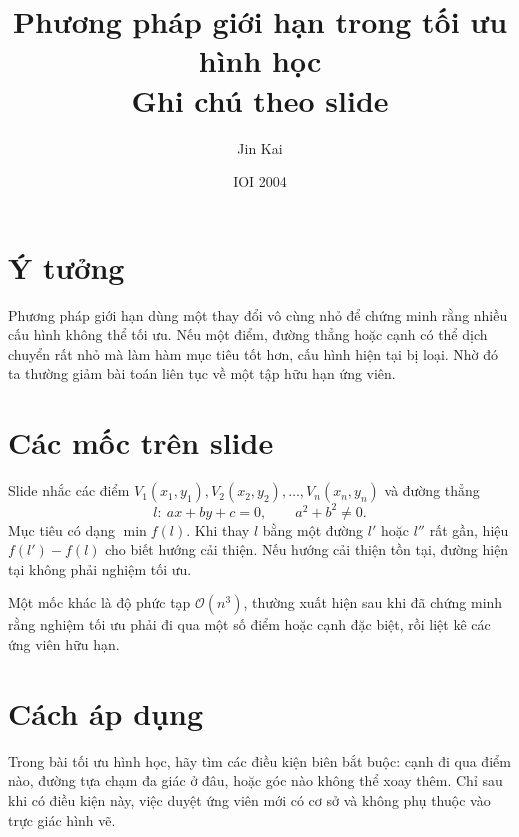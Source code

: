 \documentclass[11pt]{article}
\title{Phương pháp giới hạn trong tối ưu hình học\\{\large Ghi chú theo slide}}
\author{Jin Kai}
\date{IOI 2004}
\newcommand{\Oh}{\mathcal{O}}
\begin{document}
\maketitle


\section{Ý tưởng}

Phương pháp giới hạn dùng một thay đổi vô cùng nhỏ để chứng minh rằng nhiều
cấu hình không thể tối ưu. Nếu một điểm, đường thẳng hoặc cạnh có thể dịch
chuyển rất nhỏ mà làm hàm mục tiêu tốt hơn, cấu hình hiện tại bị loại. Nhờ đó
ta thường giảm bài toán liên tục về một tập hữu hạn ứng viên.

\section{Các mốc trên slide}

Slide nhắc các điểm \(V_1(x_1,y_1),V_2(x_2,y_2),\ldots,V_n(x_n,y_n)\) và
đường thẳng
\[
  l:\ ax+by+c=0,\qquad a^2+b^2\ne 0.
\]
Mục tiêu có dạng \(\min f(l)\). Khi thay \(l\) bằng một đường \(l'\) hoặc
\(l''\) rất gần, hiệu \(f(l')-f(l)\) cho biết hướng cải thiện. Nếu hướng cải
thiện tồn tại, đường hiện tại không phải nghiệm tối ưu.

Một mốc khác là độ phức tạp \(\Oh(n^3)\), thường xuất hiện sau khi đã chứng
minh rằng nghiệm tối ưu phải đi qua một số điểm hoặc cạnh đặc biệt, rồi liệt
kê các ứng viên hữu hạn.

\section{Cách áp dụng}

Trong bài tối ưu hình học, hãy tìm các điều kiện biên bắt buộc: cạnh đi qua
điểm nào, đường tựa chạm đa giác ở đâu, hoặc góc nào không thể xoay thêm.
Chỉ sau khi có điều kiện này, việc duyệt ứng viên mới có cơ sở và không phụ
thuộc vào trực giác hình vẽ.
\end{document}
